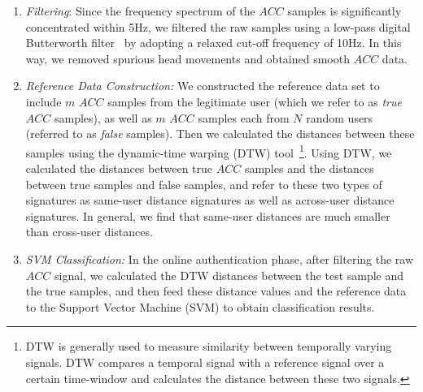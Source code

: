 \begin{enumerate}
\vspace{-2pt}\item \emph{Filtering}: Since the frequency spectrum of the $ACC$ samples is significantly concentrated within 5Hz, we filtered the raw samples using a low-pass digital Butterworth filter~\cite{challis1983design} by adopting a relaxed cut-off frequency of 10Hz. In this way, we removed spurious head movements and obtained smooth $ACC$ data.

\vspace{-2pt}\item \emph{Reference Data Construction:} We constructed the reference data set to include $m$ $ACC$ samples from the legitimate user (which we refer to as \emph{true} $ACC$ samples), as well as $m$ $ACC$ samples each from $N$ random users (referred to as \emph{false} samples). Then we calculated the distances between these samples using the dynamic-time warping (DTW) tool~\cite{dtw}\footnote{DTW is generally used to measure similarity between temporally varying signals. DTW compares a temporal signal with a reference signal over a certain time-window and calculates the distance between these two signals.}. Using DTW, we calculated the distances between true $ACC$ samples and the distances between true samples and false samples, and refer to these two types of signatures as same-user distance signatures as well as across-user distance signatures. In general, we find that same-user distances are much smaller than cross-user distances. 

\vspace{-2pt}\item \emph{SVM Classification:} In the online authentication phase, after filtering the raw $ACC$ signal, we calculated the DTW distances between the test sample and the true samples, and then feed these distance values and the reference data to the Support Vector Machine (SVM) to obtain classification results. %

\end{enumerate}


